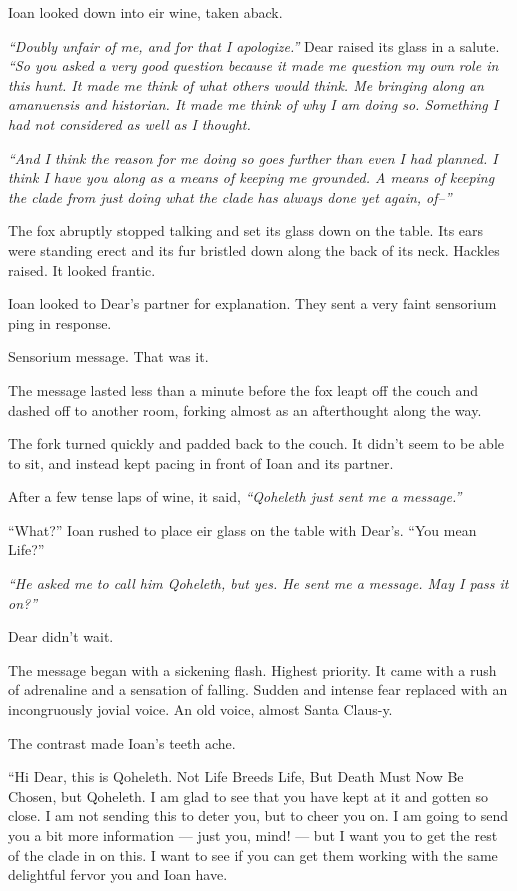 Ioan looked down into eir wine, taken aback.

\emph{``Doubly unfair of me, and for that I apologize.''} Dear raised its glass in a salute. \emph{``So you asked a very good question because it made me question my own role in this hunt. It made me think of what others would think. Me bringing along an amanuensis and historian. It made me think of why I am doing so. Something I had not considered as well as I thought.}

\emph{``And I think the reason for me doing so goes further than even I had planned. I think I have you along as a means of keeping me grounded. A means of keeping the clade from just doing what the clade has always done yet again, of--''}

The fox abruptly stopped talking and set its glass down on the table. Its ears were standing erect and its fur bristled down along the back of its neck. Hackles raised. It looked frantic.

Ioan looked to Dear's partner for explanation. They sent a very faint sensorium ping in response.

Sensorium message. That was it.

The message lasted less than a minute before the fox leapt off the couch and dashed off to another room, forking almost as an afterthought along the way.

The fork turned quickly and padded back to the couch. It didn't seem to be able to sit, and instead kept pacing in front of Ioan and its partner.

After a few tense laps of wine, it said, \emph{``Qoheleth just sent me a message.''}

``What?'' Ioan rushed to place eir glass on the table with Dear's. ``You mean Life?''

\emph{``He asked me to call him Qoheleth, but yes. He sent me a message. May I pass it on?''}

Dear didn't wait.

The message began with a sickening flash. Highest priority. It came with a rush of adrenaline and a sensation of falling. Sudden and intense fear replaced with an incongruously jovial voice. An old voice, almost Santa Claus-y.

The contrast made Ioan's teeth ache.

``Hi Dear, this is Qoheleth. Not Life Breeds Life, But Death Must Now Be Chosen, but Qoheleth. I am glad to see that you have kept at it and gotten so close. I am not sending this to deter you, but to cheer you on. I am going to send you a bit more information — just you, mind! — but I want you to get the rest of the clade in on this. I want to see if you can get them working with the same delightful fervor you and Ioan have.


